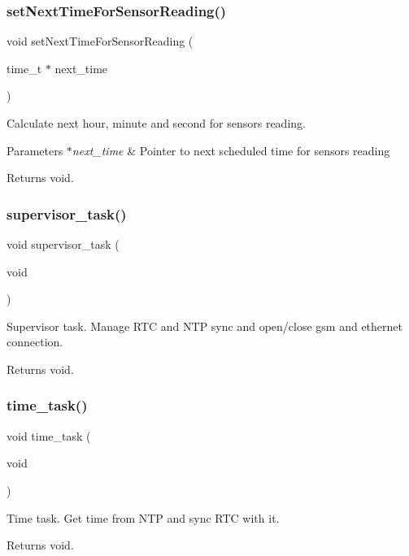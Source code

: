\subsubsection{\texorpdfstring{set\+Next\+Time\+For\+Sensor\+Reading()}{setNextTimeForSensorReading()}}
{\footnotesize\ttfamily void set\+Next\+Time\+For\+Sensor\+Reading (\begin{DoxyParamCaption}\item[{time\+\_\+t $\ast$}]{next\+\_\+time }\end{DoxyParamCaption})}



Calculate next hour, minute and second for sensors reading. 


\begin{DoxyParams}{Parameters}
{\em $\ast$next\+\_\+time} & Pointer to next scheduled time for sensors reading \\
\hline
\end{DoxyParams}
\begin{DoxyReturn}{Returns}
void. 
\end{DoxyReturn}
\mbox{\label{rmap_8ino_a2f44f14407ed3f1ae93126c1533e697b}} 
\subsubsection{\texorpdfstring{supervisor\+\_\+task()}{supervisor\_task()}}
{\footnotesize\ttfamily void supervisor\+\_\+task (\begin{DoxyParamCaption}\item[{void}]{ }\end{DoxyParamCaption})}



Supervisor task. Manage R\+TC and N\+TP sync and open/close gsm and ethernet connection. 

\begin{DoxyReturn}{Returns}
void. 
\end{DoxyReturn}
\mbox{\label{rmap_8ino_a35c29025c5ef3d135b8c2b038be3f8df}} 
\subsubsection{\texorpdfstring{time\+\_\+task()}{time\_task()}}
{\footnotesize\ttfamily void time\+\_\+task (\begin{DoxyParamCaption}\item[{void}]{ }\end{DoxyParamCaption})}



Time task. Get time from N\+TP and sync R\+TC with it. 

\begin{DoxyReturn}{Returns}
void. 
\end{DoxyReturn}
